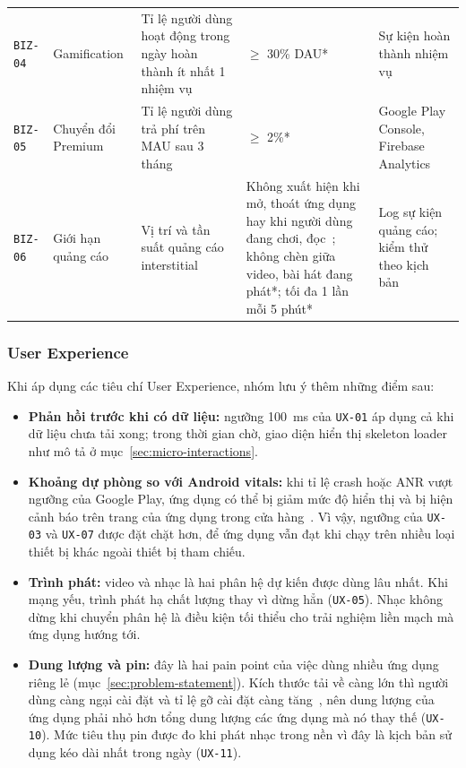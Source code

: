 \begin{longtable}{@{}>{\raggedright\arraybackslash}p{1.2cm}>{\raggedright\arraybackslash}p{2.4cm}>{\raggedright\arraybackslash}p{4.2cm}>{\raggedright\arraybackslash}p{3.7cm}>{\raggedright\arraybackslash}p{3.5cm}@{}}
\texttt{BIZ-04} & Gamification & Tỉ lệ người dùng hoạt động trong ngày hoàn thành ít nhất 1 nhiệm vụ & $\ge$ 30\% DAU* & Sự kiện hoàn thành nhiệm vụ \\
\texttt{BIZ-05} & Chuyển đổi Premium & Tỉ lệ người dùng trả phí trên MAU sau 3 tháng & $\ge$ 2\%* & Google Play Console, Firebase Analytics \\
\texttt{BIZ-06} & Giới hạn quảng cáo & Vị trí và tần suất quảng cáo interstitial & Không xuất hiện khi mở, thoát ứng dụng hay khi người dùng đang chơi, đọc~\cite{admob-interstitial}; không chèn giữa video, bài hát đang phát*; tối đa 1 lần mỗi 5 phút* & Log sự kiện quảng cáo; kiểm thử theo kịch bản \\
\end{longtable}
\endgroup

\subsubsection{User Experience}

Khi áp dụng các tiêu chí User Experience, nhóm lưu ý thêm những điểm sau:
\begin{itemize}
    \item \textbf{Phản hồi trước khi có dữ liệu:} ngưỡng 100~ms của \texttt{UX-01} áp dụng cả khi dữ liệu chưa tải xong; trong thời gian chờ, giao diện hiển thị skeleton loader như mô tả ở mục~\ref{sec:micro-interactions}.
    \item \textbf{Khoảng dự phòng so với Android vitals:} khi tỉ lệ crash hoặc ANR vượt ngưỡng của Google Play, ứng dụng có thể bị giảm mức độ hiển thị và bị hiện cảnh báo trên trang của ứng dụng trong cửa hàng~\cite{android-vitals}.
    Vì vậy, ngưỡng của \texttt{UX-03} và \texttt{UX-07} được đặt chặt hơn, để ứng dụng vẫn đạt khi chạy trên nhiều loại thiết bị khác ngoài thiết bị tham chiếu.
    \item \textbf{Trình phát:} video và nhạc là hai phân hệ dự kiến được dùng lâu nhất.
    Khi mạng yếu, trình phát hạ chất lượng thay vì dừng hẳn (\texttt{UX-05}).
    Nhạc không dừng khi chuyển phân hệ là điều kiện tối thiểu cho trải nghiệm liền mạch mà ứng dụng hướng tới.
    \item \textbf{Dung lượng và pin:} đây là hai pain point của việc dùng nhiều ứng dụng riêng lẻ (mục~\ref{sec:problem-statement}).
    Kích thước tải về càng lớn thì người dùng càng ngại cài đặt và tỉ lệ gỡ cài đặt càng tăng~\cite{android-app-size}, nên dung lượng của ứng dụng phải nhỏ hơn tổng dung lượng các ứng dụng mà nó thay thế (\texttt{UX-10}).
    Mức tiêu thụ pin được đo khi phát nhạc trong nền vì đây là kịch bản sử dụng kéo dài nhất trong ngày (\texttt{UX-11}).
\end{itemize}

